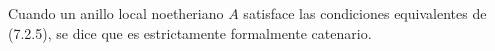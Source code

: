 \begin{definition}[7.2.6]
\label{IV.2.s7.2.6-fr}
Cuando un anillo local noetheriano $A$ satisface las condiciones
equivalentes de \textup{(7.2.5)}, se dice que es estrictamente
formalmente catenario.
\end{definition}
